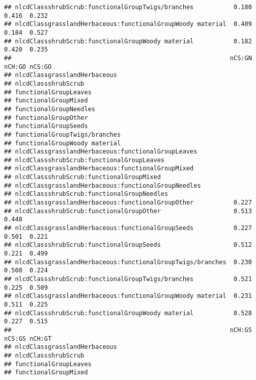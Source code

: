 \documentclass[]{article}
\begin{document}
\begin{verbatim}
## nlcdClassshrubScrub:functionalGroupTwigs/branches           0.180  0.416  0.232
## nlcdClassgrasslandHerbaceous:functionalGroupWoody material  0.409  0.184  0.527
## nlcdClassshrubScrub:functionalGroupWoody material           0.182  0.420  0.235
##                                                            nCS:GN nCH:GO nCS:GO
## nlcdClassgrasslandHerbaceous                                                   
## nlcdClassshrubScrub                                                            
## functionalGroupLeaves                                                          
## functionalGroupMixed                                                           
## functionalGroupNeedles                                                         
## functionalGroupOther                                                           
## functionalGroupSeeds                                                           
## functionalGroupTwigs/branches                                                  
## functionalGroupWoody material                                                  
## nlcdClassgrasslandHerbaceous:functionalGroupLeaves                             
## nlcdClassshrubScrub:functionalGroupLeaves                                      
## nlcdClassgrasslandHerbaceous:functionalGroupMixed                              
## nlcdClassshrubScrub:functionalGroupMixed                                       
## nlcdClassgrasslandHerbaceous:functionalGroupNeedles                            
## nlcdClassshrubScrub:functionalGroupNeedles                                     
## nlcdClassgrasslandHerbaceous:functionalGroupOther           0.227              
## nlcdClassshrubScrub:functionalGroupOther                    0.513  0.448       
## nlcdClassgrasslandHerbaceous:functionalGroupSeeds           0.227  0.501  0.221
## nlcdClassshrubScrub:functionalGroupSeeds                    0.512  0.221  0.499
## nlcdClassgrasslandHerbaceous:functionalGroupTwigs/branches  0.230  0.508  0.224
## nlcdClassshrubScrub:functionalGroupTwigs/branches           0.521  0.225  0.509
## nlcdClassgrasslandHerbaceous:functionalGroupWoody material  0.231  0.511  0.225
## nlcdClassshrubScrub:functionalGroupWoody material           0.528  0.227  0.515
##                                                            nCH:GS nCS:GS nCH:GT
## nlcdClassgrasslandHerbaceous                                                   
## nlcdClassshrubScrub                                                            
## functionalGroupLeaves                                                          
## functionalGroupMixed                                                           

\end{verbatim}
\end{document}
